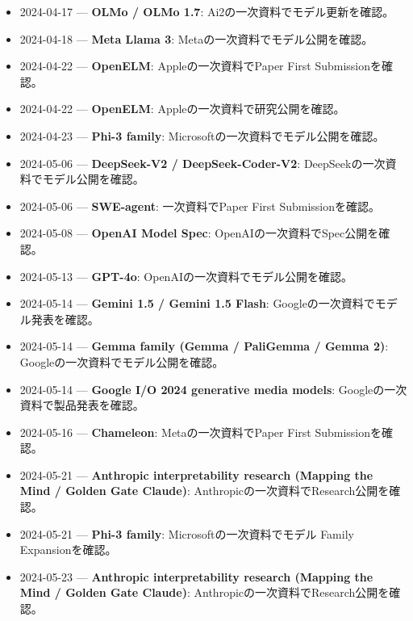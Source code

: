 \begin{itemize}[leftmargin=1.5em,itemsep=0.25em]
\item 2024-04-17 — \textbf{OLMo / OLMo 1.7}: Ai2の一次資料でモデル更新を確認。 \autocite{src-3d2fa83e273d}
\item 2024-04-18 — \textbf{Meta Llama 3}: Metaの一次資料でモデル公開を確認。 \autocite{src-f9616f30e8f5}
\item 2024-04-22 — \textbf{OpenELM}: Appleの一次資料でPaper First Submissionを確認。 \autocite{src-4d404eabda6e}
\item 2024-04-22 — \textbf{OpenELM}: Appleの一次資料で研究公開を確認。 \autocite{src-4d404eabda6e}
\item 2024-04-23 — \textbf{Phi-3 family}: Microsoftの一次資料でモデル公開を確認。 \autocite{src-e78721484043}
\item 2024-05-06 — \textbf{DeepSeek-V2 / DeepSeek-Coder-V2}: DeepSeekの一次資料でモデル公開を確認。 \autocite{src-d9d69089eb6a}
\item 2024-05-06 — \textbf{SWE-agent}: 一次資料でPaper First Submissionを確認。 \autocite{src-1c9f1d22c176}
\item 2024-05-08 — \textbf{OpenAI Model Spec}: OpenAIの一次資料でSpec公開を確認。 \autocite{src-d1406200c99e}
\item 2024-05-13 — \textbf{GPT-4o}: OpenAIの一次資料でモデル公開を確認。 \autocite{src-2d3a533e91db}
\item 2024-05-14 — \textbf{Gemini 1.5 / Gemini 1.5 Flash}: Googleの一次資料でモデル発表を確認。 \autocite{src-28ee6f0f00f4}
\item 2024-05-14 — \textbf{Gemma family (Gemma / PaliGemma / Gemma 2)}: Googleの一次資料でモデル公開を確認。 \autocite{src-0395647db4a8}
\item 2024-05-14 — \textbf{Google I/O 2024 generative media models}: Googleの一次資料で製品発表を確認。 \autocite{src-0f33134a9129}
\item 2024-05-16 — \textbf{Chameleon}: Metaの一次資料でPaper First Submissionを確認。 \autocite{src-e1259b3c0804}
\item 2024-05-21 — \textbf{Anthropic interpretability research (Mapping the Mind / Golden Gate Claude)}: Anthropicの一次資料でResearch公開を確認。 \autocite{src-4ff5ab7d45bc}
\item 2024-05-21 — \textbf{Phi-3 family}: Microsoftの一次資料でモデル Family Expansionを確認。 \autocite{src-e78721484043}
\item 2024-05-23 — \textbf{Anthropic interpretability research (Mapping the Mind / Golden Gate Claude)}: Anthropicの一次資料でResearch公開を確認。 \autocite{src-4ff5ab7d45bc}

\end{itemize}
